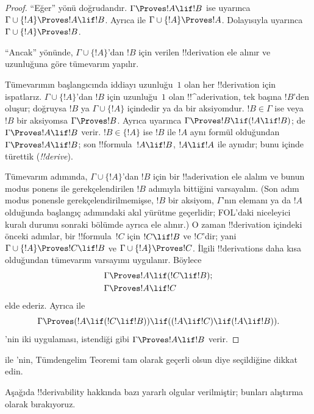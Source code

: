 \documentclass[../../../include/open-logic-section]{subfiles}
\begin{document}
\begin{proof}
``Eğer'' yönü doğrudandır. $\Gamma \Proves !A \lif !B$ ise
 uyarınca $\Gamma \cup \{!A\} \Proves
!A \lif !B$. Ayrıca  ile
$\Gamma \cup \{!A\} \Proves !A$. Dolayısıyla  uyarınca
$\Gamma \cup \{!A\} \Proves !B$.

``Ancak'' yönünde, $\Gamma \cup \{!A\}$'dan $!B$ için verilen
!!{derivation} ele alınır ve uzunluğuna göre tümevarım yapılır.

Tümevarımın başlangıcında iddiayı uzunluğu~$1$ olan her !!{derivation} için
ispatlarız. $\Gamma \cup \{!A\}$'dan $!B$ için uzunluğu~$1$ olan
!!^a{derivation}, tek başına $!B$'den oluşur; doğruysa $!B$ ya
$\Gamma \cup \{!A\}$ içindedir ya da bir aksiyomdur. $!B \in \Gamma$ ise
veya $!B$ bir aksiyomsa $\Gamma \Proves !B$. Ayrıca
 uyarınca $\Gamma \Proves !B \lif (!A \lif !B)$;
 de $\Gamma \Proves !A \lif !B$ verir. $!B \in \{!A\}$
ise $!B$ ile $!A$ aynı formül olduğundan $\Gamma \Proves !A \lif !B$;
son !!{formula}~$!A \lif !B$,
$!A \lif !A$ ile aynıdır; bunu  içinde
türettik (\emph{!!{derive}}).

Tümevarım adımında, $\Gamma \cup \{!A\}$'dan $!B$ için bir
!!a{derivation} ele alalım ve bunun modus ponens ile gerekçelendirilen $!B$
adımıyla bittiğini varsayalım. (Son adım modus ponensle gerekçelendirilmemişse,
$!B$ bir aksiyom, $\Gamma$'nın elemanı ya da $!A$ olduğunda başlangıç
adımındaki akıl yürütme geçerlidir; FOL'daki niceleyici kuralı durumu sonraki
bölümde ayrıca ele alınır.) O zaman !!{derivation}
içindeki önceki adımlar, bir
!!{formula}~$!C$ için $!C \lif !B$ ve $!C$'dir; yani
$\Gamma \cup \{!A\} \Proves !C \lif !B$ ve
$\Gamma \cup \{!A\} \Proves !C$. İlgili !!{derivation}s daha kısa
olduğundan tümevarım varsayımı uygulanır. Böylece
\begin{align*}
  & \Gamma \Proves !A \lif (!C \lif !B); \\
  & \Gamma \Proves !A \lif !C
\end{align*}
elde ederiz. Ayrıca  ile
\[
\Gamma \Proves (!A \lif (!C \lif !B)) \lif
((!A\lif !C) \lif (!A \lif !B)).
\]
'nin iki uygulaması, istendiği gibi
$\Gamma \Proves !A \lif !B$ verir.
\end{proof}

 ile 'nin, Tümdengelim Teoremi tam
olarak geçerli olsun diye seçildiğine dikkat edin.

Aşağıda !!{derivability} hakkında bazı yararlı olgular verilmiştir; bunları
alıştırma olarak bırakıyoruz.
\end{document}
